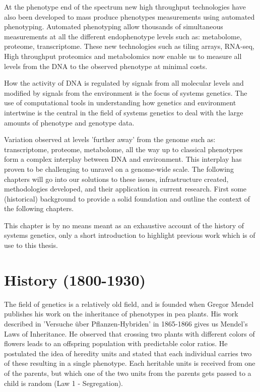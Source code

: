 At the phenotype end of the spectrum new high throughput technologies have also 
been developed to mass produce phenotypes measurements using automated phenotyping. 
Automated phenotyping allow thousands of simultaneous measurements at all the 
different endophenotype levels such as: metabolome, proteome, transcriptome. These 
new technologies such as tiling arrays, RNA-seq, High throughput proteomics and 
metabolomics now enable us to measure all levels from the DNA to the observed 
phenotype at minimal costs.

How the activity of DNA is regulated by signals from all molecular levels and modified by 
signals from the environment is the focus of systems genetics. The use of computational 
tools in understanding how genetics and environment intertwine is the central in the 
field of systems genetics to deal with the large amounts of phenotype and genotype data.

Variation observed at levels 'further away' from the genome such as: transcriptome, 
proteome, metabolome, all the way up to classical phenotypes form a complex interplay 
between DNA and environment. This interplay has proven to be challenging to unravel 
on a genome-wide scale. The following chapters will go into our solutions to these issues, 
infrastructure created, methodologies developed, and their application in current 
research. First some (historical) background to provide a solid foundation  and outline
the context of the following chapters. 

This chapter is by no means meant as an exhaustive account of the history of systems genetics, 
only a short introduction to highlight previous work which is of use to this thesis.

\section{History (1800-1930)}

The field of genetics is a relatively old field, and is founded when Gregor 
Mendel publishes his work on the inheritance of phenotypes in pea plants. 
His work described in 'Versuche \"uber Pflanzen-Hybriden' in 1865-1866 
\cite{Mendel:1866} gives us Mendel's Laws of Inheritance. He observed that 
crossing two plants with different colors of flowers leads to an offspring 
population with predictable color ratios. He postulated the idea of heredity 
units and stated that each individual carries two of these resulting in a 
single phenotype. Each heritable units is received from one of the parents, 
but which one of the two units from the parents gets passed to a child is random 
(Law 1 - Segregation).


